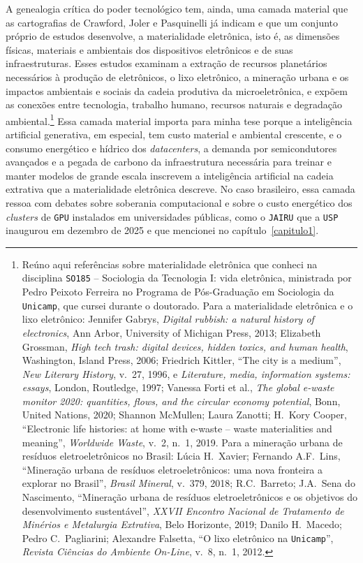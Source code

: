A genealogia crítica do poder tecnológico tem, ainda, uma camada material que as cartografias de Crawford, Joler e Pasquinelli já indicam e que um conjunto próprio de estudos desenvolve, a materialidade eletrônica, isto é, as dimensões físicas, materiais e ambientais dos dispositivos eletrônicos e de suas infraestruturas. Esses estudos examinam a extração de recursos planetários necessários à produção de eletrônicos, o lixo eletrônico, a mineração urbana e os impactos ambientais e sociais da cadeia produtiva da microeletrônica, e expõem as conexões entre tecnologia, trabalho humano, recursos naturais e degradação ambiental.\footnote{Reúno aqui referências sobre materialidade eletrônica que conheci na disciplina \texttt{SO185} -- Sociologia da Tecnologia I: vida eletrônica, ministrada por Pedro Peixoto Ferreira no Programa de Pós-Graduação em Sociologia da \texttt{Unicamp}, que cursei durante o doutorado. Para a materialidade eletrônica e o lixo eletrônico: Jennifer Gabrys, \textit{Digital rubbish: a natural history of electronics}, Ann Arbor, University of Michigan Press, 2013; Elizabeth Grossman, \textit{High tech trash: digital devices, hidden toxics, and human health}, Washington, Island Press, 2006; Friedrich Kittler, \enquote{The city is a medium}, \textit{New Literary History}, v.~27, 1996, e \textit{Literature, media, information systems: essays}, London, Routledge, 1997; Vanessa Forti et al., \textit{The global e-waste monitor 2020: quantities, flows, and the circular economy potential}, Bonn, United Nations, 2020; Shannon McMullen; Laura Zanotti; H.~Kory Cooper, \enquote{Electronic life histories: at home with e-waste -- waste materialities and meaning}, \textit{Worldwide Waste}, v.~2, n.~1, 2019. Para a mineração urbana de resíduos eletroeletrônicos no Brasil: Lúcia H.~Xavier; Fernando A.F.~Lins, \enquote{Mineração urbana de resíduos eletroeletrônicos: uma nova fronteira a explorar no Brasil}, \textit{Brasil Mineral}, v.~379, 2018; R.C.~Barreto; J.A.~Sena do Nascimento, \enquote{Mineração urbana de resíduos eletroeletrônicos e os objetivos do desenvolvimento sustentável}, \textit{XXVII Encontro Nacional de Tratamento de Minérios e Metalurgia Extrativa}, Belo Horizonte, 2019; Danilo H.~Macedo; Pedro C.~Pagliarini; Alexandre Falsetta, \enquote{O lixo eletrônico na \texttt{Unicamp}}, \textit{Revista Ciências do Ambiente On-Line}, v.~8, n.~1, 2012.} Essa camada material importa para minha tese porque a inteligência artificial generativa, em especial, tem custo material e ambiental crescente, e o consumo energético e hídrico dos \emph{datacenters}, a demanda por semicondutores avançados e a pegada de carbono da infraestrutura necessária para treinar e manter modelos de grande escala inscrevem a inteligência artificial na cadeia extrativa que a materialidade eletrônica descreve. No caso brasileiro, essa camada ressoa com debates sobre soberania computacional e sobre o custo energético dos \emph{clusters} de \texttt{GPU} instalados em universidades públicas, como o \texttt{JAIRU} que a \texttt{USP} inaugurou em dezembro de 2025 e que mencionei no capítulo~\ref{capitulo1}.

